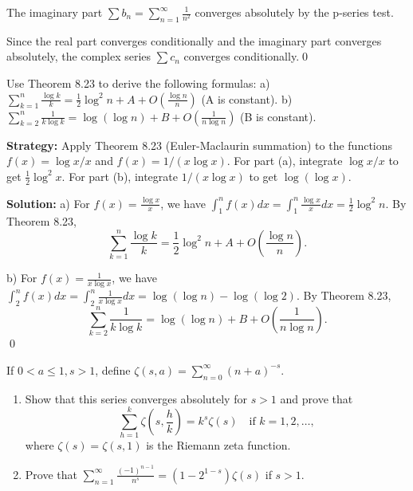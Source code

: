 The imaginary part \(\sum b_n = \sum_{n=1}^{\infty} \frac{1}{n^2}\) converges absolutely by the p-series test.

Since the real part converges conditionally and the imaginary part converges absolutely, the complex series \(\sum c_n\) converges conditionally.\qed



\begin{problembox}
\begin{problemstatement}
Use Theorem 8.23 to derive the following formulas:
a) \(\sum_{k=1}^{n} \frac{\log k}{k} = \frac{1}{2} \log^2 n + A + O \left( \frac{\log n}{n} \right)\) (A is constant).
b) \(\sum_{k=2}^{n} \frac{1}{k \log k} = \log (\log n) + B + O \left( \frac{1}{n \log n} \right)\) (B is constant).
\end{problemstatement}
\end{problembox}

\noindent\textbf{Strategy:} Apply Theorem 8.23 (Euler-Maclaurin summation) to the functions \(f(x)=\log x/x\) and \(f(x)=1/(x\log x)\). For part (a), integrate \(\log x/x\) to get \(\frac{1}{2}\log^2 x\). For part (b), integrate \(1/(x\log x)\) to get \(\log(\log x)\).

\bigskip\noindent\textbf{Solution:}
a) For \(f(x) = \frac{\log x}{x}\), we have \(\int_1^n f(x) dx = \int_1^n \frac{\log x}{x} dx = \frac{1}{2}\log^2 n\). By Theorem 8.23,
\[\sum_{k=1}^{n} \frac{\log k}{k} = \frac{1}{2}\log^2 n + A + O\left(\frac{\log n}{n}\right).\]

b) For \(f(x) = \frac{1}{x \log x}\), we have \(\int_2^n f(x) dx = \int_2^n \frac{1}{x \log x} dx = \log(\log n) - \log(\log 2)\). By Theorem 8.23,
\[\sum_{k=2}^{n} \frac{1}{k \log k} = \log(\log n) + B + O\left(\frac{1}{n \log n}\right).\]
\qed



\begin{problembox}
\begin{problemstatement}
If \(0 < a \leq 1, s > 1\), define \(\zeta(s, a) = \sum_{n=0}^{\infty} (n + a)^{-s}\).
\begin{enumerate}[label=\alph*)]
\item Show that this series converges absolutely for \(s > 1\) and prove that
\[\sum_{h=1}^{k} \zeta \left( s, \frac{h}{k} \right) = k^s \zeta(s) \quad \text{if } k = 1, 2, \ldots,\]
where \(\zeta(s) = \zeta(s, 1)\) is the Riemann zeta function.
\item Prove that \(\sum_{n=1}^{\infty} \frac{(-1)^{n-1}}{n^s} = (1 - 2^{1-s}) \zeta(s)\) if \(s > 1\).
\end{enumerate}
\end{problemstatement}
\end{problembox}

